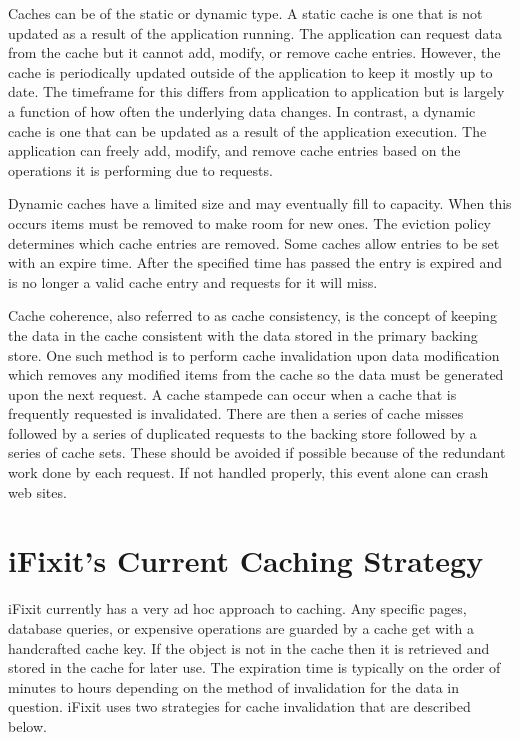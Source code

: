 \documentclass[12pt]{ucthesis}
\begin{document}
Caches can be of the static or dynamic type.
A static cache is one that is not updated as a result of the application running.
The application can request data from the cache but it cannot add, modify, or remove cache entries.
However, the cache is periodically updated outside of the application to keep it mostly up to date.
The timeframe for this differs from application to application but is largely a function of how often the underlying data changes.
In contrast, a dynamic cache is one that can be updated as a result of the application execution.
The application can freely add, modify, and remove cache entries based on the operations it is performing due to requests.

Dynamic caches have a limited size and may eventually fill to capacity.
When this occurs items must be removed to make room for new ones.
The eviction policy determines which cache entries are removed.
Some caches allow entries to be set with an expire time.
After the specified time has passed the entry is expired and is no longer a valid cache entry and requests for it will miss.

Cache coherence, also referred to as cache consistency, is the concept of keeping the data in the cache consistent with the data stored in the primary backing store.
One such method is to perform cache invalidation upon data modification which removes any modified items from the cache so the data must be generated upon the next request.
A cache stampede can occur when a cache that is frequently requested is invalidated.
There are then a series of cache misses followed by a series of duplicated requests to the backing store followed by a series of cache sets.
These should be avoided if possible because of the redundant work done by each request.
If not handled properly, this event alone can crash web sites.


\section{iFixit's Current Caching Strategy}
iFixit currently has a very ad hoc approach to caching.
Any specific pages, database queries, or expensive operations are guarded by a cache get with a handcrafted cache key.
If the object is not in the cache then it is retrieved and stored in the cache for later use.
The expiration time is typically on the order of minutes to hours depending on the method of invalidation for the data in question.
iFixit uses two strategies for cache invalidation that are described below.
\end{document}
